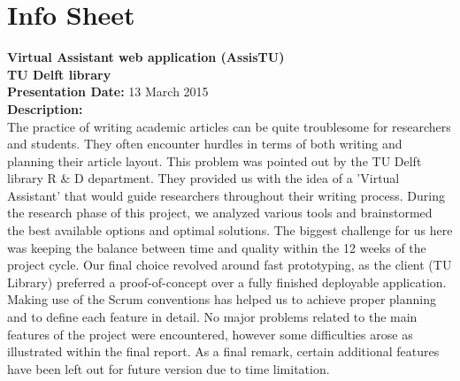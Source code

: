 \chapter{Info Sheet}    
\textbf{Virtual Assistant web application (AssisTU)\\}
\textbf{\small{TU Delft library\\}}
\textbf{Presentation Date: } 13 March 2015\\ 
\bigskip
\textbf{Description: \\}
 The practice of writing academic articles can be quite troublesome for researchers and students. They often encounter hurdles in terms of both writing 
 and planning their article layout. This problem was pointed out by the TU Delft library R \& D department. They provided us with the idea of a 
 'Virtual Assistant' that would guide researchers throughout their writing process. During the research phase of this project, we analyzed various tools and brainstormed the best available options 
 and optimal solutions. The biggest challenge for us here was keeping the balance between time and quality within the 12 weeks of the project cycle. 
 Our final choice revolved around fast prototyping, as the client (TU Library) preferred a proof-of-concept over a fully finished deployable application. 
 Making use of the Scrum conventions has helped us to achieve proper planning and to define each feature in detail. No major problems related to the 
 main features of the project were encountered, however some difficulties arose as illustrated within the final report. As a final remark, certain 
 additional features have been left out for future version due to time limitation.\\

